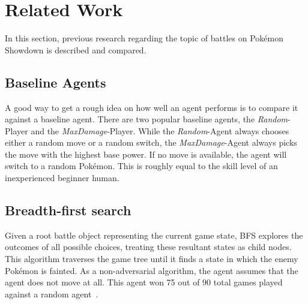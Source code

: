 
\chapter{Related Work}
\label{ch:relatedwork}

In this section, previous research regarding the topic of battles on Pokémon Showdown is described and compared.

\section{Baseline Agents}
\label{sec:eval-challenges-baseline}
A good way to get a rough idea on how well an agent performs is to compare it against a baseline agent.
There are two popular baseline agents, the \textit{Random}-Player and the \textit{MaxDamage}-Player.
While the \textit{Random}-Agent always chooses either a random move or a random switch, the \textit{MaxDamage}-Agent
always picks the move with the highest base power. If no move is available, the agent will switch to a random 
Pokémon. This is roughly equal to the skill level of an inexperienced beginner human. 

\section{Breadth-first search}
\label{sec:related-bfs}
Given a root battle object representing the current game state, \ac{BFS} explores the outcomes of all possible choices,
treating these resultant states as child nodes. This algorithm traverses the game tree until it finds a state in which
the enemy Pokémon is fainted. As a non-adversarial algorithm, the agent assumes that the agent does not move at all.
This agent won 75 out of 90 total games played against a random agent~\autocite{Lee_Togelius_2017}.

